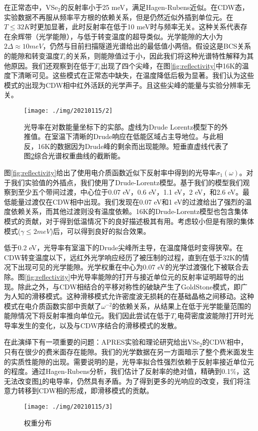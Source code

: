 \documentclass[reprint, aps, prb, showkeys]{revtex4-2}
\begin{document}
在正常态中，VSe$_2$的反射率小于25 meV，满足Hagen-Rubens近似。在CDW态，实验数据不再服从频率平方根的依赖关系，但是仍然近似外插到单位元。在$T \leq 32K$时更加显著，此时反射率在低于10 meV时与频率无关。这种关系代表存在余辉带（光学能隙），与低于转变温度的超导类似。光学能隙的大小为$2\Delta \approx 10 meV$，仍然与目前扫描隧道光谱给出的最低值小两倍。假设这是BCS关系的能隙和转变温度$T_c$的关系，则能隙值过于小，因此我们将这种光谱特性解释为其他原因。我们还观察到在低于$T_c$出现了四个尖峰，在图\ref{fig:reflectivity}中16K的温度下清晰可见。这些模式在正常态中缺失，在温度降低后极为显著。我们认为这些模式的出现为CDW相中红外活跃的光学声子。且这些尖峰的能量与实验分辨率无关。

\begin{figure}[t]
    \texttt{[image: ./img/20210115/2]}
    \caption{\label{fig:conductivity} 
    光导率在对数能量坐标下的实部。虚线为Drude Lorentz模型下的外推值。在室温下清晰的Drude响应在低能区域占主导地位。与此相反，16K的数据因为Drude峰的剩余而出现能隙。短垂直虚线代表了图\ref{fig:weight}综合光谱权重曲线的截断能。
    }
\end{figure}

图\ref{fig:reflectivity}给出了使用电介质函数近似下反射率中得到的光导率$\sigma_1(\omega)$。对于我们实验值的外插点，我们使用了Drude-Lorentz模型。基于我们的模型我们观察到至少五个带间过渡，中心位于0.07 eV，0.6 eV，1.1 eV，2 eV，和2.6 eV。最低能量过渡仅在CDW相中出现。我们发现在0.07 eV和1 eV的过渡给出了强烈的温度依赖关系，而其他过渡则没有温度依赖。16K的Drude-Lorentz模型也包含集体模式的贡献，对于得到低温情况下的良好描述极其有用。考虑较小但是有限的集体模式($\gamma \leq 2 meV$)后，可以得到良好的拟合效果。

低于0.2 eV，光导率有室温下的Drude尖峰所主导，在温度降低时变得狭窄。在CDW转变温度以下，远红外光学响应经历了被压制的过程，直到在低于32K的情况下出现可见的光学能隙。光学权重在中心为0.07 eV的光学过渡强化下被联合去除。图\ref{fig:reflectivity}中光导率能隙的打开与接近单位元的反射率证明超导的出现。除此之外，与CDW相结合的平移对称性的破缺产生了GoldStone模式，即广为人知的滑移模式。这种滑移模式允许密度波无损耗的在基础晶格之间移动。这种模式在电介质函数实部中贡献了$\omega^{-2}$的依赖关系，从结果上在低于光学能量范围的能隙情况下将反射率推向单位元。我们因此尝试在低于$T_c$电荷密度波能隙打开时光导率发生的变化，以及与CDW序结合的滑移模式的发散。

在此演绎下有一项重要的问题：APRES实验和理论研究给出VSe$_2$的CDW相中，只有在很少的费米面存在能隙。我们的光学数据在另一方面暗示了整个费米面发生的实质性能隙的出现。需要说明的是，光导率拟合性强烈依赖于反射率接近单位元的程度。通过Hagen-Rubens分析，我们估计了反射率的绝对值，精确到0.1\%，这无法改变图\ref{fig:conductivity}的电导率，仍然具有矛盾。为了得到更多的光响应的改变，我们将注意力转移到CDW相的形成，即滑移模式的贡献。
\begin{figure}[b]
    \texttt{[image: ./img/20210115/3]}
    \caption{\label{fig:weight} 
    权重分布
    }
\end{figure}
\end{document}
